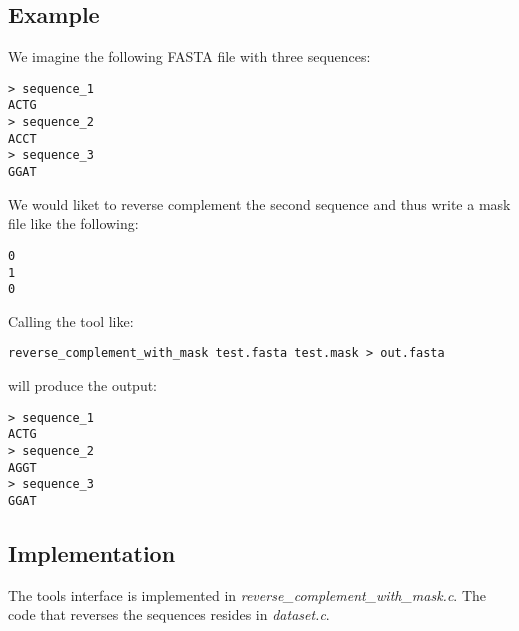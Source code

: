 \subsection{Example}
We imagine the following FASTA file with three sequences:
\begin{lstlisting}
> sequence_1
ACTG
> sequence_2
ACCT
> sequence_3
GGAT
\end{lstlisting}
We would liket to reverse complement the second sequence and thus
write a mask file like the following:
\begin{lstlisting}
0
1
0
\end{lstlisting}
Calling the tool like:
\begin{lstlisting}
reverse_complement_with_mask test.fasta test.mask > out.fasta
\end{lstlisting}
will produce the output:
\begin{lstlisting}
> sequence_1
ACTG
> sequence_2
AGGT
> sequence_3
GGAT
\end{lstlisting}

\subsection{Implementation}
The tools interface is implemented in \emph{reverse\_complement\_with\_mask.c}.
The code that reverses the sequences resides in \emph{dataset.c}.
